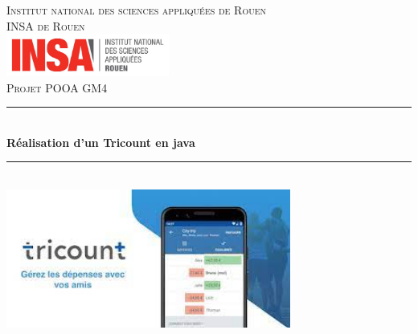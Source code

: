 \documentclass[12,french]{report}
\newcommand{\HRule}{\rule{\linewidth}{0.5mm}}
\begin{document}
\hypersetup{pdfborder=0 0 0}

\begin{titlepage}

\begin{center}
	\textsc{{\LARGE Institut national des sciences appliquées de Rouen} \\ 			\vspace{6mm} {\Large INSA de Rouen}} \\
	\vspace{5mm}
	\includegraphics[width=0.4\textwidth]{./Images_pooa/insa}\\[1.0 cm]

	\textsc{\Large Projet POOA GM4}\\[0.6cm]

	\HRule \\[0.5cm]
	{ \Huge \bfseries Réalisation d'un Tricount en java}\\[0.2cm]
	\HRule \\[0.75cm]

	\includegraphics[width=0.7\textwidth]{./Images_pooa/Tricount}\\[0.9 cm]


\end{center}
\end{titlepage}
\end{document}
